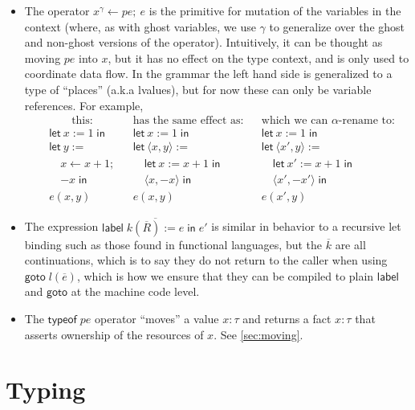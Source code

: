 \documentclass[acmsmall,nonacm]{acmart}
\begin{document}
\begin{itemize}
  \item The operator $x^\gamma\gets pe;\ e$ is the primitive for mutation of the variables in the context (where, as with ghost variables, we use $\gamma$ to generalize over the ghost and non-ghost versions of the operator). Intuitively, it can be thought as moving $pe$ into $x$, but it has no effect on the type context, and is only used to coordinate data flow. In the grammar the left hand side is generalized to a type of ``places'' (a.k.a lvalues), but for now these can only be variable references. For example,
  \begin{align*}
    &\qquad\mbox{this:}
      &&\!\!\!\!\!\!\mbox{has the same effect as:}
        &&\!\!\!\!\!\!\mbox{which we can $\alpha$-rename to:}\\
    &\mathsf{let}\ x := 1\;\mathsf{in}
      &&\mathsf{let}\ x := 1\;\mathsf{in}
        &&\mathsf{let}\ x := 1\;\mathsf{in}\\
    &\mathsf{let}\ y :=
      &&\mathsf{let}\ \langle x,y\rangle :=
        &&\mathsf{let}\ \langle x',y\rangle :=\\
    &\quad x \gets x+1;
      &&\quad \mathsf{let}\ x := x+1\;\mathsf{in}\;
        &&\quad \mathsf{let}\ x' := x+1\;\mathsf{in}\;\\
    &\quad {-x}\;\mathsf{in}
      &&\quad \langle x,-x\rangle\;\mathsf{in}
        &&\quad \langle x',-x'\rangle\;\mathsf{in}\\
    &e(x,y)
      &&e(x,y)
        &&e(x',y)
  \end{align*}

  \item The expression $\mathsf{label}\;\overline{k(\overline{R}):=e}\;\mathsf{in}\;e'$ is similar in behavior to a recursive let binding such as those found in functional languages, but the $\overline{k}$ are all continuations, which is to say they do not return to the caller when using $\mathsf{goto}\;l(\overline{e})$, which is how we ensure that they can be compiled to plain $\mathsf{label}$ and $\mathsf{goto}$ at the machine code level.

  \item The $\mathsf{typeof}\;pe$ operator ``moves'' a value $x:\tau$ and returns a fact $\boxed{x:\tau}$ that asserts ownership of the resources of $x$. See \ref{sec:moving}.
\end{itemize}

\section{Typing}
\end{document}
